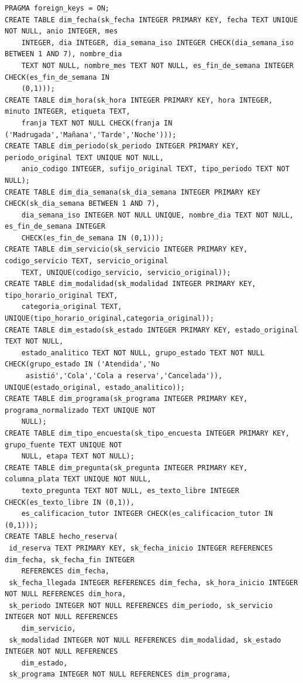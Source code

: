 \documentclass[11pt,letterpaper]{article}
\begin{document}
\begingroup\footnotesize\begin{verbatim}
PRAGMA foreign_keys = ON;
CREATE TABLE dim_fecha(sk_fecha INTEGER PRIMARY KEY, fecha TEXT UNIQUE NOT NULL, anio INTEGER, mes 
    INTEGER, dia INTEGER, dia_semana_iso INTEGER CHECK(dia_semana_iso BETWEEN 1 AND 7), nombre_dia 
    TEXT NOT NULL, nombre_mes TEXT NOT NULL, es_fin_de_semana INTEGER CHECK(es_fin_de_semana IN 
    (0,1)));
CREATE TABLE dim_hora(sk_hora INTEGER PRIMARY KEY, hora INTEGER, minuto INTEGER, etiqueta TEXT, 
    franja TEXT NOT NULL CHECK(franja IN ('Madrugada','Mañana','Tarde','Noche')));
CREATE TABLE dim_periodo(sk_periodo INTEGER PRIMARY KEY, periodo_original TEXT UNIQUE NOT NULL, 
    anio_codigo INTEGER, sufijo_original TEXT, tipo_periodo TEXT NOT NULL);
CREATE TABLE dim_dia_semana(sk_dia_semana INTEGER PRIMARY KEY CHECK(sk_dia_semana BETWEEN 1 AND 7), 
    dia_semana_iso INTEGER NOT NULL UNIQUE, nombre_dia TEXT NOT NULL, es_fin_de_semana INTEGER 
    CHECK(es_fin_de_semana IN (0,1)));
CREATE TABLE dim_servicio(sk_servicio INTEGER PRIMARY KEY, codigo_servicio TEXT, servicio_original 
    TEXT, UNIQUE(codigo_servicio, servicio_original));
CREATE TABLE dim_modalidad(sk_modalidad INTEGER PRIMARY KEY, tipo_horario_original TEXT, 
    categoria_original TEXT, UNIQUE(tipo_horario_original,categoria_original));
CREATE TABLE dim_estado(sk_estado INTEGER PRIMARY KEY, estado_original TEXT NOT NULL, 
    estado_analitico TEXT NOT NULL, grupo_estado TEXT NOT NULL CHECK(grupo_estado IN ('Atendida','No
     asistió','Cola','Cola a reserva','Cancelada')), UNIQUE(estado_original, estado_analitico));
CREATE TABLE dim_programa(sk_programa INTEGER PRIMARY KEY, programa_normalizado TEXT UNIQUE NOT 
    NULL);
CREATE TABLE dim_tipo_encuesta(sk_tipo_encuesta INTEGER PRIMARY KEY, grupo_fuente TEXT UNIQUE NOT 
    NULL, etapa TEXT NOT NULL);
CREATE TABLE dim_pregunta(sk_pregunta INTEGER PRIMARY KEY, columna_plata TEXT UNIQUE NOT NULL, 
    texto_pregunta TEXT NOT NULL, es_texto_libre INTEGER CHECK(es_texto_libre IN (0,1)), 
    es_calificacion_tutor INTEGER CHECK(es_calificacion_tutor IN (0,1)));
CREATE TABLE hecho_reserva(
 id_reserva TEXT PRIMARY KEY, sk_fecha_inicio INTEGER REFERENCES dim_fecha, sk_fecha_fin INTEGER 
    REFERENCES dim_fecha,
 sk_fecha_llegada INTEGER REFERENCES dim_fecha, sk_hora_inicio INTEGER NOT NULL REFERENCES dim_hora,
 sk_periodo INTEGER NOT NULL REFERENCES dim_periodo, sk_servicio INTEGER NOT NULL REFERENCES 
    dim_servicio,
 sk_modalidad INTEGER NOT NULL REFERENCES dim_modalidad, sk_estado INTEGER NOT NULL REFERENCES 
    dim_estado,
 sk_programa INTEGER NOT NULL REFERENCES dim_programa,

\end{verbatim}
\end{document}

